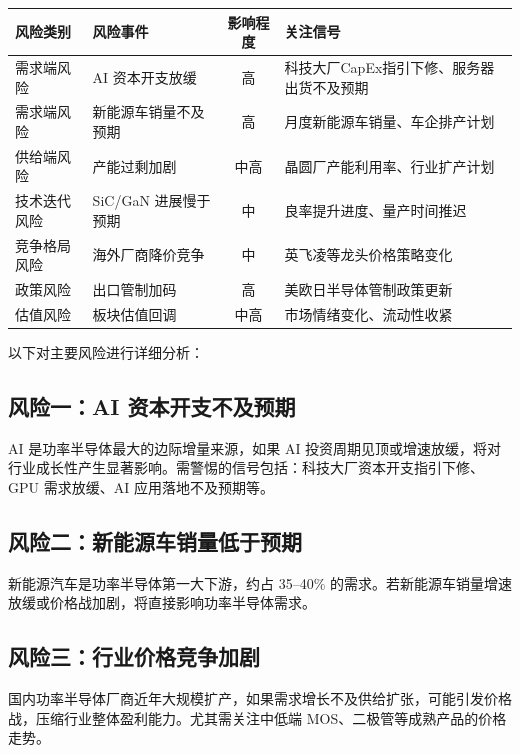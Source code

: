 \begin{riskbox}[风险因素一览]
\small
\begin{tabularx}{\textwidth}{X L{3cm} c L{4.5cm}}
\toprule
\textbf{风险类别} & \textbf{风险事件} & \textbf{影响程度} & \textbf{关注信号} \\
\midrule
需求端风险 & AI 资本开支放缓 & \textcolor{riskred}{高} & 科技大厂CapEx指引下修、服务器出货不及预期 \\
需求端风险 & 新能源车销量不及预期 & \textcolor{riskred}{高} & 月度新能源车销量、车企排产计划 \\
供给端风险 & 产能过剩加剧 & \textcolor{riskamber}{中高} & 晶圆厂产能利用率、行业扩产计划 \\
技术迭代风险 & SiC/GaN 进展慢于预期 & \textcolor{riskamber}{中} & 良率提升进度、量产时间推迟 \\
\midrule
竞争格局风险 & 海外厂商降价竞争 & \textcolor{riskamber}{中} & 英飞凌等龙头价格策略变化 \\
政策风险 & 出口管制加码 & \textcolor{riskred}{高} & 美欧日半导体管制政策更新 \\
估值风险 & 板块估值回调 & \textcolor{riskamber}{中高} & 市场情绪变化、流动性收紧 \\
\bottomrule
\end{tabularx}
\end{riskbox}

以下对主要风险进行详细分析：

\subsection{风险一：AI 资本开支不及预期}

AI 是功率半导体最大的边际增量来源，如果 AI 投资周期见顶或增速放缓，将对行业成长性产生显著影响。需警惕的信号包括：科技大厂资本开支指引下修、GPU 需求放缓、AI 应用落地不及预期等。

\subsection{风险二：新能源车销量低于预期}

新能源汽车是功率半导体第一大下游，约占 35–40\% 的需求。若新能源车销量增速放缓或价格战加剧，将直接影响功率半导体需求。

\subsection{风险三：行业价格竞争加剧}

国内功率半导体厂商近年大规模扩产，如果需求增长不及供给扩张，可能引发价格战，压缩行业整体盈利能力。尤其需关注中低端 MOS、二极管等成熟产品的价格走势。


